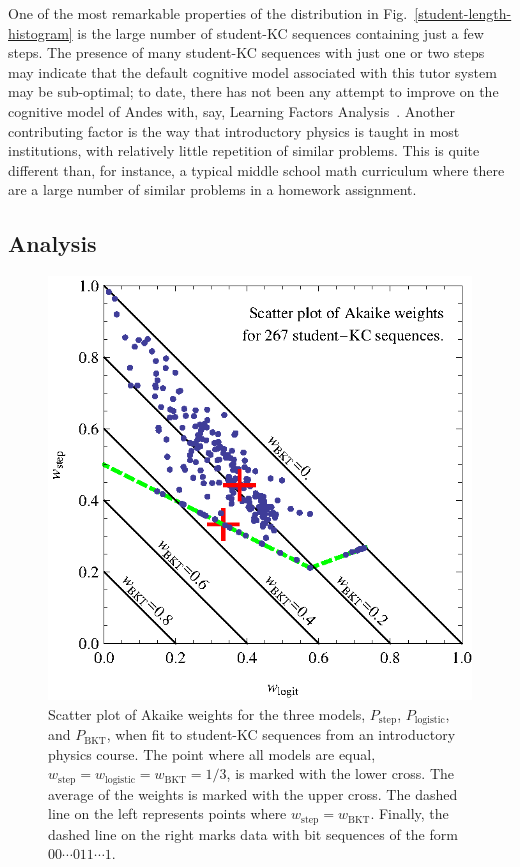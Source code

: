\documentclass{edm_template}
\begin{document}
One of the most remarkable properties of the distribution in
Fig.~\ref{student-length-histogram} is the large number of
student-KC sequences containing just a few steps.
The presence of many student-KC sequences with just one or two
steps may indicate that the default cognitive model associated 
with this tutor system may be sub-optimal; to date, there has not 
been any attempt to improve on the cognitive model of 
Andes with, say, Learning Factors Analysis~\cite{cen_learning_2006}.
Another contributing factor is the way that introductory physics is 
taught in most institutions, with relatively little repetition of 
similar problems.  This is quite different than, for instance, 
a typical middle school math curriculum where there are a large number
of similar problems in a homework assignment.

\subsection{Analysis}

\begin{figure}
  \centering \includegraphics{scatter-weights.eps}
  \caption{Scatter plot of  Akaike weights for the three models, 
   $P_\mathrm{step}$, $P_\mathrm{logistic}$, and $P_\mathrm{BKT}$, 
   when fit to student-KC sequences from an introductory physics course.
   The point where all models are equal,
   $w_\mathrm{step}=w_\mathrm{logistic}=w_\mathrm{BKT}=1/3$, is
   marked with the lower cross.  
   The average of the  weights is marked with
   the upper cross.
  The dashed line on the left represents points
   where $w_\mathrm{step}=w_\mathrm{BKT}$.  Finally, the dashed line on 
   the right marks data with bit sequences of the form
   $00\cdots 011\cdots 1$.} 
   \label{scatter1}
\end{figure}
\end{document}
